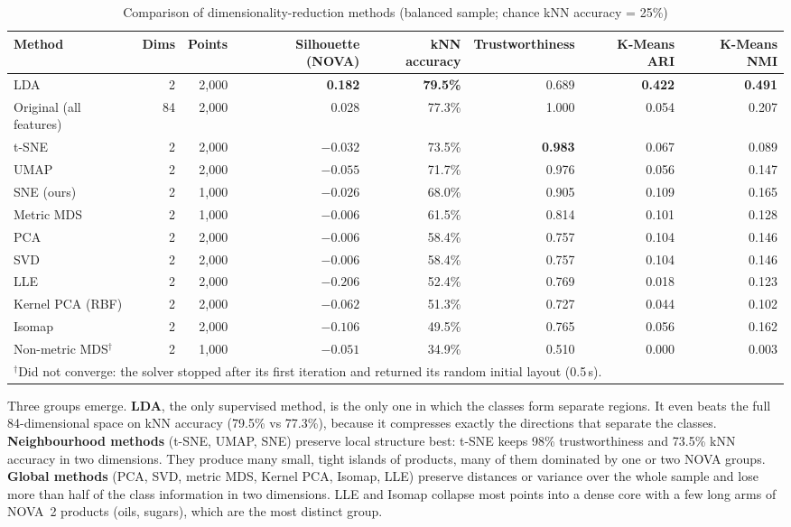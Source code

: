 \documentclass[conference]{IEEEtran}
\begin{document}
\begin{table}[t]
\centering
\caption{Comparison of dimensionality-reduction methods (balanced sample; chance kNN accuracy = 25\%)}
\label{tab:dr}
\setlength{\tabcolsep}{5pt}
\begin{tabular}{lrrrrrrr}
\toprule
Method & Dims & Points & Silhouette (NOVA) & kNN accuracy & Trustworthiness & K-Means ARI & K-Means NMI \\
\midrule
LDA & 2 & 2,000 & \textbf{0.182} & \textbf{79.5\%} & 0.689 & \textbf{0.422} & \textbf{0.491} \\
Original (all features) & 84 & 2,000 & 0.028 & 77.3\% & 1.000 & 0.054 & 0.207 \\
t-SNE & 2 & 2,000 & $-0.032$ & 73.5\% & \textbf{0.983} & 0.067 & 0.089 \\
UMAP & 2 & 2,000 & $-0.055$ & 71.7\% & 0.976 & 0.056 & 0.147 \\
SNE (ours) & 2 & 1,000 & $-0.026$ & 68.0\% & 0.905 & 0.109 & 0.165 \\
Metric MDS & 2 & 1,000 & $-0.006$ & 61.5\% & 0.814 & 0.101 & 0.128 \\
PCA & 2 & 2,000 & $-0.006$ & 58.4\% & 0.757 & 0.104 & 0.146 \\
SVD & 2 & 2,000 & $-0.006$ & 58.4\% & 0.757 & 0.104 & 0.146 \\
LLE & 2 & 2,000 & $-0.206$ & 52.4\% & 0.769 & 0.018 & 0.123 \\
Kernel PCA (RBF) & 2 & 2,000 & $-0.062$ & 51.3\% & 0.727 & 0.044 & 0.102 \\
Isomap & 2 & 2,000 & $-0.106$ & 49.5\% & 0.765 & 0.056 & 0.162 \\
Non-metric MDS$^\dagger$ & 2 & 1,000 & $-0.051$ & 34.9\% & 0.510 & 0.000 & 0.003 \\
\bottomrule
\multicolumn{8}{l}{\footnotesize $^\dagger$Did not converge: the solver stopped after its first iteration and returned its random initial layout (0.5\,s).}
\end{tabular}
\end{table}

Three groups emerge. \textbf{LDA}, the only supervised method, is the only one in which the classes form separate regions. It even beats the full 84-dimensional space on kNN accuracy (79.5\% vs 77.3\%), because it compresses exactly the directions that separate the classes. \textbf{Neighbourhood methods} (t-SNE, UMAP, SNE) preserve local structure best: t-SNE keeps 98\% trustworthiness and 73.5\% kNN accuracy in two dimensions. They produce many small, tight islands of products, many of them dominated by one or two NOVA groups. \textbf{Global methods} (PCA, SVD, metric MDS, Kernel PCA, Isomap, LLE) preserve distances or variance over the whole sample and lose more than half of the class information in two dimensions. LLE and Isomap collapse most points into a dense core with a few long arms of NOVA~2 products (oils, sugars), which are the most distinct group.
\end{document}
